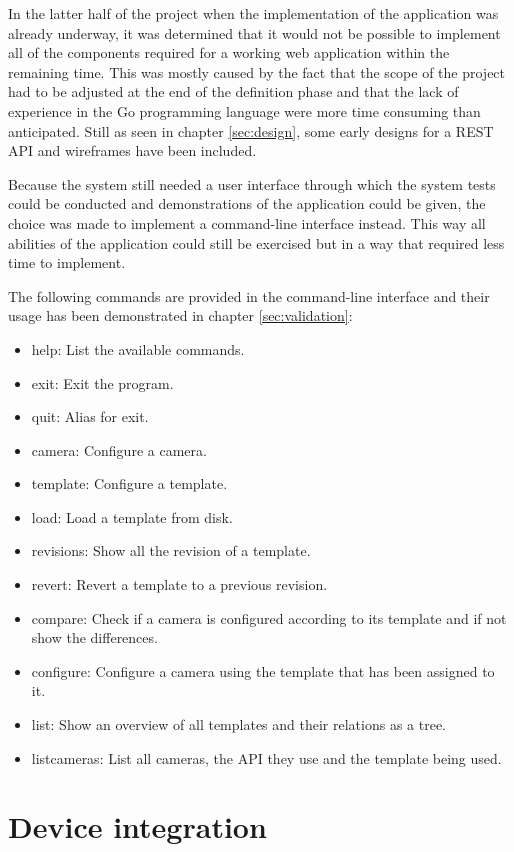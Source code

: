 In the latter half of the project when the implementation of the application was already underway, it was determined that it would not be possible to implement all of the components required for a working web application within the remaining time.
This was mostly caused by the fact that the scope of the project had to be adjusted at the end of the definition phase and that the lack of experience in the Go programming language were more time consuming than anticipated.
Still as seen in chapter \ref{sec:design}, some early designs for a REST API and wireframes have been included.

Because the system still needed a user interface through which the system tests could be conducted and demonstrations of the application could be given, the choice was made to implement a command-line interface instead.
This way all abilities of the application could still be exercised but in a way that required less time to implement.

The following commands are provided in the command-line interface and their usage has been demonstrated in chapter \ref{sec:validation}:
\begin{itemize}
	\item help: List the available commands.
	\item exit: Exit the program.
	\item quit: Alias for exit.
	\item camera: Configure a camera.
	\item template: Configure a template.
	\item load: Load a template from disk.
	\item revisions: Show all the revision of a template.
	\item revert: Revert a template to a previous revision.
	\item compare: Check if a camera is configured according to its template and if not show the differences.
	\item configure: Configure a camera using the template that has been assigned to it.
	\item list: Show an overview of all templates and their relations as a tree.
	\item listcameras: List all cameras, the API they use and the template being used.
\end{itemize}

\section{Device integration}
